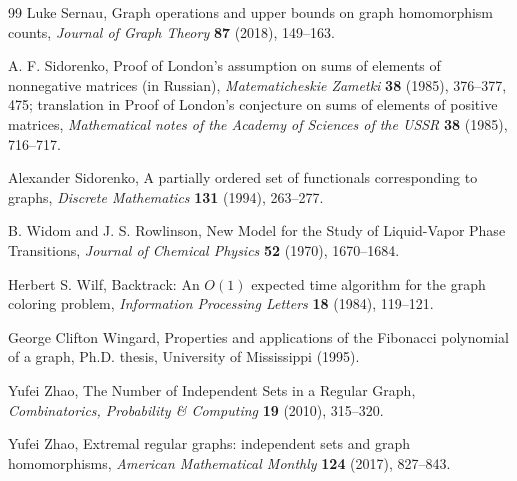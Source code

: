 \documentclass[11pt]{article}
\theoremstyle{definition}
\begin{document}
\begin{thebibliography}{99}
Luke Sernau, Graph operations and upper bounds on graph homomorphism counts, {\it Journal of Graph Theory} {\bf 87} (2018), 149--163.

A. F. Sidorenko, Proof of London's assumption on sums of elements of nonnegative matrices (in Russian), {\it Matematicheskie Zametki} {\bf 38} (1985), 376–377, 475; translation in Proof of London's conjecture on sums of elements of positive matrices, {\it Mathematical notes of the Academy of Sciences of the USSR} {\bf 38} (1985), 716--717. 

Alexander Sidorenko, A partially ordered set of functionals corresponding to graphs, {\it Discrete Mathematics} {\bf 131} (1994), 263--277.

B. Widom and J. S. Rowlinson, New Model for the Study of Liquid-Vapor Phase
Transitions, {\it Journal of Chemical Physics} {\bf 52} (1970), 1670--1684.

Herbert S. Wilf, Backtrack: An $O(1)$ expected time algorithm for the graph coloring problem, {\it Information Processing Letters} {\bf 18} (1984), 119--121.

George Clifton Wingard, Properties and applications of the Fibonacci polynomial of a graph, Ph.D. thesis, University of Mississippi (1995).

Yufei Zhao, The Number of Independent Sets in a Regular Graph, {\it Combinatorics, Probability \& Computing} {\bf 19} (2010), 315--320.

Yufei Zhao, Extremal regular graphs: independent sets and graph homomorphisms, {\it American Mathematical Monthly} {\bf 124} (2017), 827--843.

\end{thebibliography}
\end{document}
